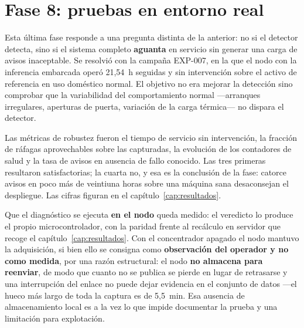 \section{Fase 8: pruebas en entorno real}

Esta última fase responde a una pregunta distinta de la anterior: no si el detector detecta, sino
si el sistema completo \textbf{aguanta} en servicio sin generar una carga de avisos inaceptable.
Se resolvió con la campaña EXP-007, en la que el nodo con la inferencia embarcada operó
\mbox{21,54 h} seguidas y sin intervención sobre el activo de referencia en uso doméstico normal.
El objetivo no era mejorar la detección sino comprobar que la variabilidad del comportamiento
normal —arranques irregulares, aperturas de puerta, variación de la carga térmica— no dispara el
detector.

Las métricas de robustez fueron el tiempo de servicio sin intervención, la fracción de ráfagas
aprovechables sobre las capturadas, la evolución de los contadores de salud y la tasa de avisos en
ausencia de fallo conocido. Las tres primeras resultaron satisfactorias; la cuarta no, y esa es la
conclusión de la fase: catorce avisos en poco más de veintiuna horas sobre una máquina sana
desaconsejan el despliegue. Las cifras figuran en el capítulo~\ref{cap:resultados}.

Que el diagnóstico se ejecuta \textbf{en el nodo} queda medido: el veredicto lo produce el propio
microcontrolador, con la paridad frente al recálculo en servidor que recoge el
capítulo~\ref{cap:resultados}. Con el concentrador apagado el nodo mantuvo la adquisición, si bien
ello se consigna como \textbf{observación del operador y no como medida}, por una razón
estructural: el nodo \textbf{no almacena para reenviar}, de modo que cuanto no se publica se pierde
en lugar de retrasarse y una interrupción del enlace no puede dejar evidencia en el conjunto de
datos —el hueco más largo de toda la captura es de \mbox{5,5 min}. Esa ausencia de almacenamiento
local es a la vez lo que impide documentar la prueba y una limitación para explotación.

